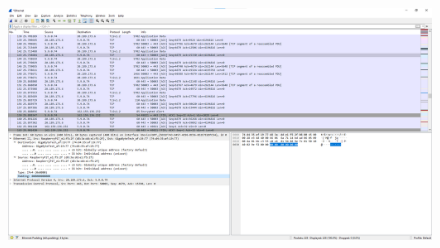\begin{figure}[p]
    \centering
    \includegraphics[width=1\textwidth]{./assets/3.7.d.padding.png}
    \caption{}
    \label{fig:3.7.d.padding}
\end{figure}

\FloatBarrier
